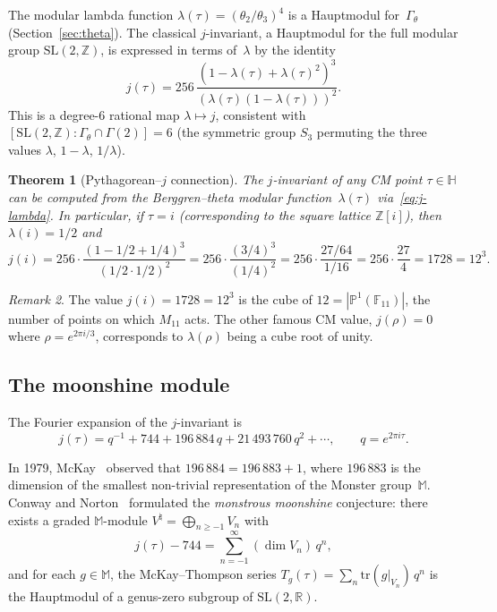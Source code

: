 \documentclass[12pt]{amsart}
\newtheorem{theorem}{Theorem}[section]
\theoremstyle{definition}
\theoremstyle{remark}
\newtheorem{remark}[theorem]{Remark}
\newcommand{\SL}{\mathrm{SL}}
\newcommand{\Z}{\mathbb{Z}}
\newcommand{\R}{\mathbb{R}}
\newcommand{\HH}{\mathbb{H}}
\newcommand{\PP}{\mathbb{P}}
\newcommand{\tr}{\mathrm{tr}}
\newcommand{\Gtheta}{\Gamma_\theta}
\newcommand{\Monster}{\mathbb{M}}
\begin{document}
The modular lambda function $\lambda(\tau) = (\theta_2/\theta_3)^4$
is a Hauptmodul for~$\Gtheta$ (Section~\ref{sec:theta}).  The classical
$j$-invariant, a Hauptmodul for the full modular group $\SL(2,\Z)$, is
expressed in terms of~$\lambda$ by the identity
\begin{equation}\label{eq:j-lambda}
j(\tau) = 256\,\frac{(1 - \lambda(\tau) + \lambda(\tau)^2)^3}
{(\lambda(\tau)(1 - \lambda(\tau)))^2}.
\end{equation}
This is a degree-6 rational map $\lambda \mapsto j$, consistent with
$[\SL(2,\Z) : \Gtheta \cap \Gamma(2)] = 6$ (the symmetric group $S_3$
permuting the three values $\lambda$, $1-\lambda$, $1/\lambda$).

\begin{theorem}[Pythagorean--$j$ connection]\label{thm:j-ppt}
The $j$-invariant of any CM point $\tau \in \HH$ can be computed from
the Berggren--theta modular function~$\lambda(\tau)$
via~\eqref{eq:j-lambda}.  In particular, if $\tau = i$ (corresponding
to the square lattice $\Z[i]$), then $\lambda(i) = 1/2$ and
\[
j(i) = 256 \cdot \frac{(1 - 1/2 + 1/4)^3}{(1/2 \cdot 1/2)^2}
= 256 \cdot \frac{(3/4)^3}{(1/4)^2}
= 256 \cdot \frac{27/64}{1/16}
= 256 \cdot \frac{27}{4} = 1728 = 12^3.
\]
\end{theorem}

\begin{remark}
The value $j(i) = 1728 = 12^3$ is the cube of $12 = |\PP^1(\mathbb{F}_{11})|$,
the number of points on which $M_{11}$ acts.  The other famous CM value,
$j(\rho) = 0$ where $\rho = e^{2\pi i/3}$, corresponds to $\lambda(\rho)$
being a cube root of unity.
\end{remark}

\subsection{The moonshine module}

The Fourier expansion of the $j$-invariant is
\begin{equation}\label{eq:j-fourier}
j(\tau) = q^{-1} + 744 + 196\,884\,q + 21\,493\,760\,q^2 + \cdots,
\qquad q = e^{2\pi i \tau}.
\end{equation}

In 1979, McKay~\cite{mckay-monster} observed that $196\,884 = 196\,883 + 1$,
where $196\,883$ is the dimension of the smallest non-trivial
representation of the Monster group~$\Monster$.  Conway and
Norton~\cite{conway-norton} formulated the \emph{monstrous moonshine}
conjecture: there exists a graded $\Monster$-module
$V^\natural = \bigoplus_{n \ge -1} V_n$ with
\[
j(\tau) - 744 = \sum_{n=-1}^{\infty} (\dim V_n)\, q^n,
\]
and for each $g \in \Monster$, the McKay--Thompson series
$T_g(\tau) = \sum_{n} \tr(g|_{V_n})\, q^n$ is the Hauptmodul of a
genus-zero subgroup of $\SL(2,\R)$.
\end{document}
